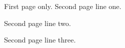 \documentclass{article}
\begin{document}
First page only.
\newpage
Second page line one.\par
Second page line two.\par
Second page line three.\par
\end{document}
